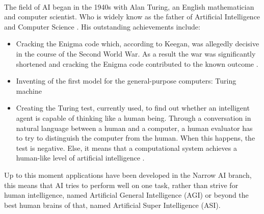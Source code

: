 \paragraph{}The field of AI began in the 1940s with Alan Turing, an  English mathematician and computer scientist. Who is widely know as the father of Artificial Intelligence and Computer Science \citet{beavers2013alan}.
His outstanding achievements include: 
\begin{itemize}
\item  Cracking the Enigma code which,  according to Keegan, was allegedly decisive in the course of the Second World War. As a result the war was significantly shortened and cracking the Enigma code contributed to the known outcome \citet{Keegan2003}. 
\item Inventing of the first model for the general-purpose computers: Turing machine \cite{Booker_turingand}
\item Creating the Turing test, currently used, to find out whether an intelligent agent is capable of thinking like a human being. Through a conversation in natural language between a human and a computer, a human evaluator has to try to distinguish the computer from the human. When this happens, the test is negative. Else, it means that a computational system achieves a human-like level of artificial intelligence \citet{Bowen2016}.
\end{itemize}\espaco

Up to this moment applications have been developed in the Narrow AI branch, this means that AI tries to perform well on one task, rather than strive for human intelligence, named Artificial General Intelligence (AGI) or beyond the best human brains of that, named Artificial Super Intelligence (ASI).

